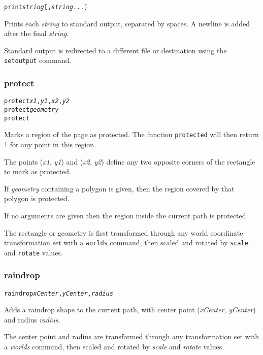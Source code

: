 \begin{alltt}
print \textit{string} [, \textit{string} ...]
\end{alltt}

Prints each \textit{string} to standard output,
separated by spaces.
A newline is added after the final \textit{string}.

Standard output is redirected to a different file
or destination using the \texttt{setoutput} command.

\subsubsection{protect}

\begin{alltt}
protect \textit{x1}, \textit{y1}, \textit{x2}, \textit{y2}
protect \textit{geometry}
protect
\end{alltt}

Marks a region of the page as protected.
The function \texttt{protected} will then return 1 for any
point in this region.

The points
(\textit{x1}, \textit{y1}) and (\textit{x2}, \textit{y2}) define
any two opposite corners of the rectangle to mark as protected.

If \textit{geometry} containing a polygon is given, then the region
covered by that polygon is protected.

If no arguments are given then the region inside the current path is
protected.

The rectangle or geometry
is first transformed through any world coordinate
transformation set with a \texttt{worlds} command,
then scaled and rotated by \texttt{scale}
and \texttt{rotate} values.

\subsubsection{raindrop}

\begin{alltt}
raindrop \textit{xCenter}, \textit{yCenter}, \textit{radius}
\end{alltt}

Adds a raindrop shape to the current path, with center
point (\textit{xCenter}, \textit{yCenter}) and radius
\textit{radius}.

The center point and radius are transformed through any
transformation set with a \textit{worlds} command,
then scaled and rotated by \textit{scale}
and \textit{rotate} values.


